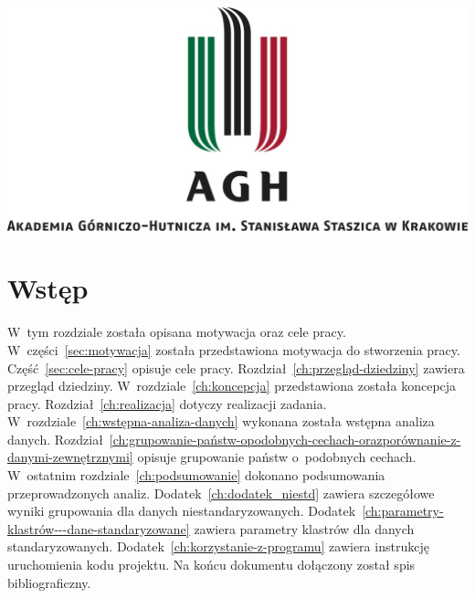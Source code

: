 \documentclass[11pt]{report}
\begin{document}
    \begin{titlepage}
        \centering
        \includegraphics[width=\linewidth]{fig/AGH.jpg}
        \vspace{0.03\textheight}
        \bigskip
        \vspace{0.2\textheight}
        \par

        \vspace{0.1\textheight}
    \end{titlepage}

    \tableofcontents


    \chapter{Wstęp}

    W~tym rozdziale została opisana motywacja oraz cele pracy.
    W~części~\ref{sec:motywacja} została przedstawiona motywacja do stworzenia pracy.
    Część~\ref{sec:cele-pracy} opisuje cele pracy.
    Rozdział~\ref{ch:przegląd-dziedziny} zawiera przegląd dziedziny.
    W~rozdziale~\ref{ch:koncepcja} przedstawiona została koncepcja pracy.
    Rozdział~\ref{ch:realizacja} dotyczy realizacji zadania.
    W~rozdziale~\ref{ch:wstępna-analiza-danych} wykonana została wstępna analiza danych.
    Rozdział~\ref{ch:grupowanie-państw-opodobnych-cechach-orazporównanie-z-danymi-zewnętrznymi} opisuje grupowanie państw o~podobnych cechach.
    W~ostatnim rozdziale~\ref{ch:podsumowanie} dokonano podsumowania przeprowadzonych analiz.
    Dodatek~\ref{ch:dodatek_niestd} zawiera szczegółowe wyniki grupowania dla danych niestandaryzowanych.
    Dodatek~\ref{ch:parametry-klastrów---dane-standaryzowane} zawiera parametry klastrów dla danych standaryzowanych.
    Dodatek~\ref{ch:korzystanie-z-programu} zawiera instrukcję uruchomienia kodu projektu.
    Na końcu dokumentu dołączony został spis bibliograficzny.
\end{document}
